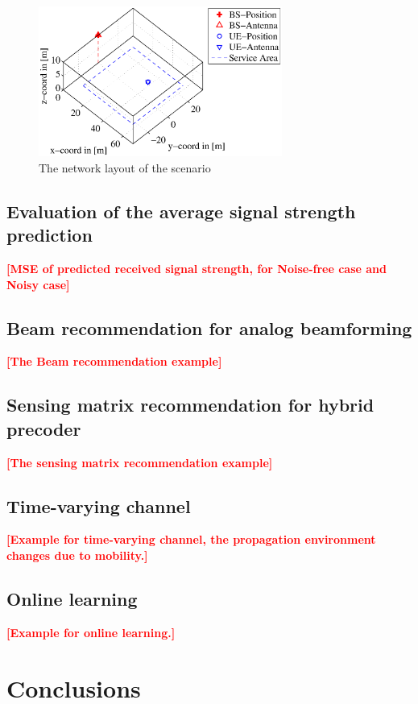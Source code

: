 \documentclass[12pt, draftcls, onecolumn]{IEEEtran}
\theoremstyle{plain}
\theoremstyle{definition}
\theoremstyle{remark}
\newcommand{\nt}[1]{\textcolor{red}{\textbf{[#1]}}}
\begin{document}
\begin{figure}
	\centering
	\includegraphics[width=8cm]{Layout_pic_V2.eps}
	\caption{The network layout of the scenario}
	\label{fig:Scenario}
	\vspace{-5mm}
\end{figure}




\subsection{Evaluation of the average signal strength prediction}
\nt{MSE of predicted received signal strength, for Noise-free case and Noisy case}

\subsection{Beam recommendation for analog beamforming}
\nt{The Beam recommendation example}



\subsection{Sensing matrix recommendation for hybrid precoder}
\nt{The sensing matrix recommendation example}

\subsection{Time-varying channel}
\nt{Example for time-varying channel, the propagation environment changes due to mobility.}

\subsection{Online learning}
\nt{Example for online learning.}


\section{Conclusions}








\appendices

\ifCLASSOPTIONcaptionsoff
  \newpage
\fi


 
\end{document}
